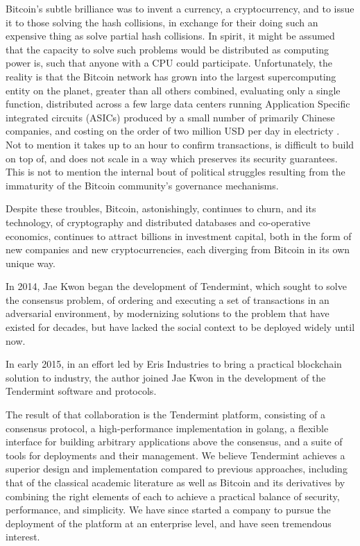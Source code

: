 Bitcoin's subtle brilliance was to invent a currency, a cryptocurrency, and to issue it to those solving the hash collisions, 
in exchange for their doing such an expensive thing as solve partial hash collisions.
In spirit, it might be assumed that the capacity to solve such problems would be distributed as computing power is, 
such that anyone with a CPU could participate.
Unfortunately, the reality is that the Bitcoin network has grown into the largest supercomputing entity on the planet, greater than all others combined,
evaluating only a single function, distributed across a few large data centers running Application Specific integrated circuits (ASICs) produced by a small number of primarily Chinese companies, and costing on the order of two million USD per day in electricty \cite{blockchaininfo}.
Not to mention it takes up to an hour to confirm transactions, is difficult to build on top of, and does not scale in a way which preserves its security guarantees.
This is not to mention the internal bout of political struggles resulting from the immaturity of the Bitcoin community's governance mechanisms.

Despite these troubles, Bitcoin, astonishingly, continues to churn,
and its technology, 
of cryptography and distributed databases and co-operative economics,
continues to attract billions in investment capital,
both in the form of new companies and new cryptocurrencies,
each diverging from Bitcoin in its own unique way.

In 2014, Jae Kwon began the development of Tendermint, which sought to solve the consensus problem,
of ordering and executing a set of transactions in an adversarial environment, 
by modernizing solutions to the problem that have existed for decades,
but have lacked the social context to be deployed widely until now.

In early 2015, in an effort led by Eris Industries to bring a practical blockchain solution to industry,
the author joined Jae Kwon in the development of the Tendermint software and protocols.

The result of that collaboration is the Tendermint platform, consisting of a consensus protocol, a high-performance implementation in golang, 
a flexible interface for building arbitrary applications above the consensus, and a suite of tools for deployments and their management.
We believe Tendermint achieves a superior design and implementation compared to previous approaches, 
including that of the classical academic literature \cite{dls,pbft,raft} as well as Bitcoin \cite{bitcoin} and its derivatives \cite{ethereum,sidechains,peercoin}
by combining the right elements of each to achieve a practical balance of security, performance, and simplicity.
We have since started a company to pursue the deployment of the platform at an enterprise level, and have seen tremendous interest.

